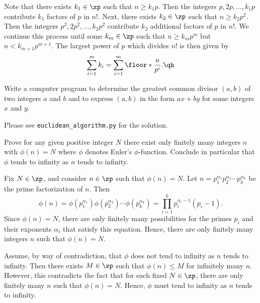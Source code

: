 \begin{sol}
    Note that there exists $k_1 \in \zp$ such that $n \geq k_1p$. Then the integers $p, 2p, \ldots, k_1p$ contribute $k_1$ factors of $p$ in $n!$. Next, there exists $k_2 \in \zp$ such that $n \geq k_2p^2$. Then the integers $p^2, 2p^2, \ldots, k_2p^2$ contribute $k_2$ additional factors of $p$ in $n!$. We continue this process until some $k_m \in \zp$ such that $n \geq k_m p^m$ but $n < k_{m+1} p^{m+1}$. The largest power of $p$ which divides $n!$ is then given by
    \[\sum_{i=1}^m k_i = \sum_{i=1}^m \floor*{\frac{n}{p^i}}. \qh\]
\end{sol}

\begin{exercise} \label{ex0.2.9}
    Write a computer program to determine the greatest common divisor $(a, b)$ of two integers $a$ and $b$ and to express $(a, b)$ in the form $ax + by$ for some integers $x$ and $y$.
\end{exercise}

\begin{sol}
    Please see \verb|euclidean_algorithm.py| for the solution.
\end{sol}

\begin{exercise}\label{ex0.2.10}
    Prove for any given positive integer $N$ there exist only finitely many integers $n$ with $\phi(n) = N$ where $\phi$ denotes Euler's $\phi$-function. Conclude in particular that $\phi$ tends to infinity as $n$ tends to infinity.
\end{exercise}

\begin{sol}
    Fix $N \in \zp$, and consider $n \in \zp$ such that $\phi(n) = N$. Let $n = p_1^{\alpha_1} p_2^{\alpha_2} \cdots p_k^{\alpha_k}$ be the prime factorization of $n$. Then
    \[\phi(n) = \phi(p_1^{\alpha_1}) \phi(p_2^{\alpha_2}) \cdots \phi(p_k^{\alpha_k}) = \prod_{i=1}^k p_i^{\alpha_i - 1}(p_i - 1).\]
    Since $\phi(n) = N$, there are only finitely many possibilities for the primes $p_i$ and their exponents $\alpha_i$ that satisfy this equation. Hence, there are only finitely many integers $n$ such that $\phi(n) = N$.

    Assume, by way of contradiction, that $\phi$ does not tend to infinity as $n$ tends to infinity. Then there exists $M \in \zp$ such that $\phi(n) \leq M$ for infinitely many $n$. However, this contradicts the fact that for each fixed $N \in \zp$, there are only finitely many $n$ such that $\phi(n) = N$. Hence, $\phi$ must tend to infinity as $n$ tends to infinity.
\end{sol}

